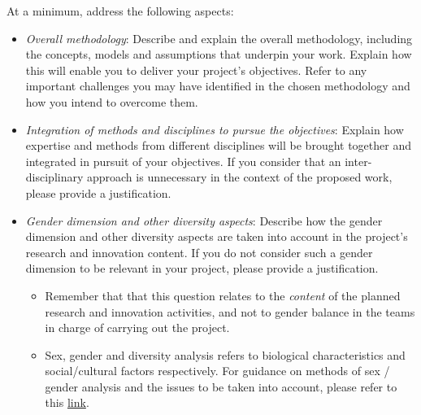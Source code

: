 \documentclass[12pt,draftproposal]{msca-pf}
\begin{document}
\begin{mscaexplanation}
At a minimum, address the following aspects:

\begin{itemize}
    \item \emph{Overall methodology}: Describe and explain the overall methodology,
    including the concepts, models and assumptions that underpin your work.
    Explain how this will enable you to deliver your project’s objectives. Refer
    to any important challenges you may have identified in the chosen methodology
    and how you intend to overcome them.

    \item \emph{Integration of methods and disciplines to pursue the objectives}:
    Explain how expertise and methods from different disciplines will be brought
    together and integrated in pursuit of your objectives. If you consider that
    an inter-disciplinary\footnotemark{} approach is unnecessary in the
    context of the proposed work, please provide a justification.


    \item \emph{Gender dimension and other diversity aspects}: Describe how the
    gender dimension and other diversity aspects are taken into account in the
    project's research and innovation content. If you do not consider such a
    gender dimension to be relevant in your project, please provide a
    justification.
    \begin{itemize}
        \item Remember that that this question relates to the \emph{content} of the
        planned research and innovation activities, and not to gender balance
        in the teams in charge of carrying out the project.

        \item  Sex, gender and diversity analysis refers to biological
        characteristics and social/cultural factors respectively. For guidance on
        methods of sex / gender analysis and the issues to be taken into account,
        please refer to this
        \href{https://op.europa.eu/en/publication-detail/-/publication/33b4c99f-2e66-11eb-b27b-01aa75ed71a1/language-en}{link}.
    \end{itemize}


\end{itemize}
\end{mscaexplanation}
\end{document}
